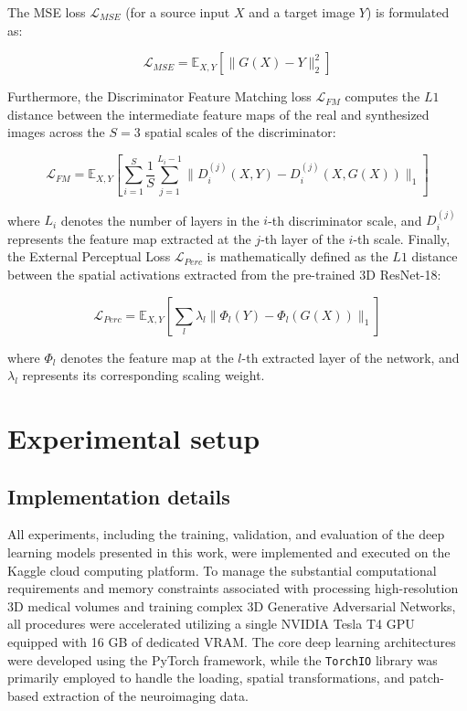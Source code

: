 \documentclass[11pt,a4paper]{article}
\begin{document}
The MSE loss $\mathcal{L}_{MSE}$ (for a source input $X$ and a target image $Y$) is formulated as:

\begin{equation}
    \mathcal{L}_{MSE} = \mathbb{E}_{X,Y}\left[\lVert G(X) - Y \rVert_2^2\right]
\end{equation}

Furthermore, the Discriminator Feature Matching loss $\mathcal{L}_{FM}$ computes the $L1$ distance between the intermediate feature maps of the real and synthesized images across the $S=3$ spatial scales of the discriminator:

\begin{equation}
    \mathcal{L}_{FM} = \mathbb{E}_{X,Y}\left[\sum_{i=1}^{S} \frac{1}{S} \sum_{j=1}^{L_i-1} \lVert D_{i}^{(j)}(X, Y) - D_{i}^{(j)}(X, G(X)) \rVert_1\right]
\end{equation}

where $L_i$ denotes the number of layers in the $i$-th discriminator scale, and $D_{i}^{(j)}$ represents the feature map extracted at the $j$-th layer of the $i$-th scale. Finally, the External Perceptual Loss $\mathcal{L}_{Perc}$ is mathematically defined as the $L1$ distance between the spatial activations extracted from the pre-trained 3D ResNet-18:

\begin{equation}
    \mathcal{L}_{Perc} = \mathbb{E}_{X,Y}\left[\sum_{l} \lambda_l \lVert \Phi_l(Y) - \Phi_l(G(X)) \rVert_1\right]
\end{equation}

where $\Phi_l$ denotes the feature map at the $l$-th extracted layer of the network, and $\lambda_l$ represents its corresponding scaling weight.


\section{Experimental setup}
\label{sec: 5}

\subsection{Implementation details}


All experiments, including the training, validation, and evaluation of the deep learning models presented in this work, were implemented and executed on the Kaggle cloud computing platform. To manage the substantial computational requirements and memory constraints associated with processing high-resolution 3D medical volumes and training complex 3D Generative Adversarial Networks, all procedures were accelerated utilizing a single NVIDIA Tesla T4 GPU equipped with 16 GB of dedicated VRAM. The core deep learning architectures were developed using the PyTorch framework, while the \texttt{TorchIO} library was primarily employed to handle the loading, spatial transformations, and patch-based extraction of the neuroimaging data.
\end{document}
